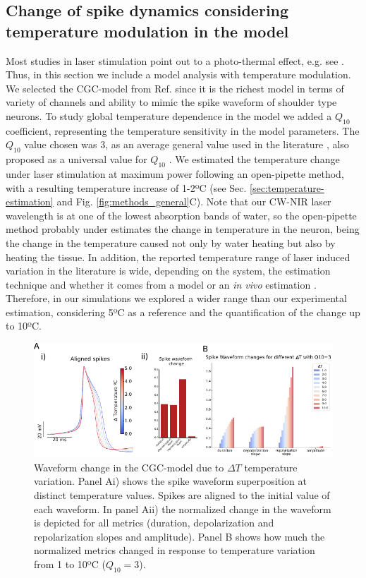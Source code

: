 \subsection{Change of spike dynamics considering temperature modulation in the model}
\label{sect:temperature model}
Most studies in laser stimulation point out to a photo-thermal effect, e.g. see . Thus, in this section we include a model analysis with temperature modulation. We selected the CGC-model from Ref.  since it is the richest model in terms of variety of channels and ability to mimic the spike waveform of shoulder type neurons. To study global temperature dependence in the model we added a $Q_{10}$ coefficient, representing the temperature sensitivity in the model parameters. The $Q_{10}$ value chosen was 3, as an average general value used in the literature \cite{hodgkin_effect_1949,Li2013,Shapiro2012, Rabbitt2016,Ganguly2019b}, also proposed as a universal value for $Q_{10}$ \cite{elias_universality_2014}. We estimated the temperature change under laser stimulation at maximum power following an open-pipette method, with a resulting temperature increase of 1-2ºC (see Sec. \ref{sec:temperature-estimation} and Fig. \ref{fig:methods_general}C). Note that our CW-NIR laser wavelength is at one of the lowest absorption bands of water, so the open-pipette method probably under estimates the change in temperature in the neuron, being the change in the temperature caused not only by water heating but also by heating the tissue. In addition, the reported temperature range of laser induced variation in the literature is wide, depending on the system, the estimation technique and whether it comes from a model or an \textit{in vivo} estimation \cite{Shapiro2012, Rabbitt2016, Thompson2012}. Therefore, in our simulations we explored a wider range than our experimental estimation, considering 5ºC as a reference and the quantification of the change up to 10ºC.

\begin{figure}[hbt!]
     \centering    
    \includegraphics[width=\textwidth]{img/laser/Q10_waveform_change.pdf}
    \caption{Waveform change in the CGC-model due to $\Delta T$ temperature variation. Panel Ai) shows the spike waveform superposition at distinct temperature values. Spikes are aligned to the initial value of each waveform. In panel Aii) the normalized change in the waveform is depicted for all metrics (duration, depolarization and repolarization slopes and amplitude). Panel B shows how much the normalized metrics changed in response to temperature variation from 1 to 10ºC ($Q_{10}=3$).}
    \label{fig:temperature model}
\end{figure}

